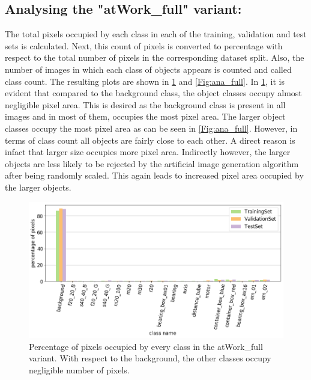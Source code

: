 	\subsection{Analysing the "atWork\_full" variant:}
		The total pixels occupied by each class in each of the training, validation and test sets is calculated. Next, this count of pixels is converted to percentage with respect to the total number of pixels in the corresponding dataset split. Also, the number of images in which each class of objects appears is counted and called class count. The resulting plots are shown in \ref{Fig:ana_full_b} and \ref{Fig:ana_full}. In \ref{Fig:ana_full_b}, it is evident that compared to the background class, the object classes occupy almost negligible pixel area. This is desired as the background class is present in all images and in most of them, occupies the most pixel area. The larger object classes occupy the most pixel area as can be seen in \ref{Fig:ana_full}. However, in terms of class count all objects are fairly close to each other. A direct reason is infact that larger size occupies more pixel area. Indirectly however, the larger objects are less likely to be rejected by the artificial image generation algorithm after being randomly scaled. This again leads to increased pixel area occupied by the larger objects.
			
			\begin{figure}[!htb]
				\centering
				\includegraphics[scale=0.4]{images/percentage_of_pixels_f}
				\caption{Percentage of pixels occupied by every class in the atWork\_full variant. With respect to the background, the other classes occupy negligible number of pixels.}
				\label{Fig:ana_full_b}
			\end{figure}
			
